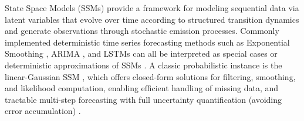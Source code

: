 \documentclass[a4paper,oneside,bibliography=totoc]{scrbook}
\begin{document}
State Space Models (SSMs)\cite{hyndman_state_2002, seeger_bayesian_2016, durbin_time_2012} 
provide a framework for modeling sequential data via latent variables that evolve over time according to structured transition dynamics and generate observations through stochastic emission processes.
Commonly implemented deterministic time series forecasting methods such as Exponential Smoothing \cite{hyndman_state_2002, hyndman_forecasting_2008}, ARIMA \cite{box_distribution_1970}, and LSTMs \cite{hochreiter_long_1997} can all be interpreted as special cases or deterministic approximations of SSMs \cite{durbin_time_2012}. 
A classic probabilistic instance is the linear-Gaussian SSM \cite{roweis_unifying_1999}, which offers closed-form solutions for filtering, smoothing, and likelihood computation, enabling efficient handling of missing data, 
and tractable multi-step forecasting with full uncertainty quantification (avoiding error accumulation) \cite{de_bezenac_normalizing_2020}.
\end{document}
